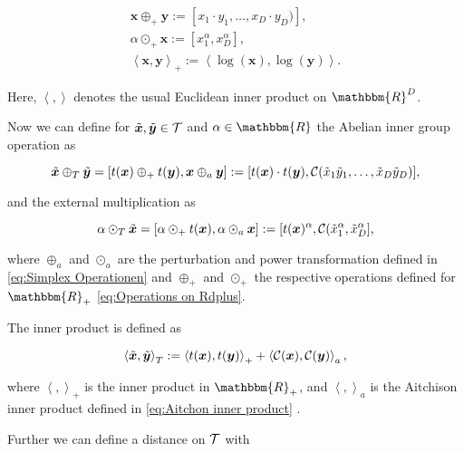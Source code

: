 \begin{gather}
\bm{x} \oplus_+ \bm{y}:= [x_1\cdot y_1,\ldots,x_D \cdot y_D)], \\
\alpha \odot_+ \bm{x} := [x_1^{\alpha},x_D^{\alpha}], \\
\left\langle \bm{x},\bm{y} \right\rangle_+ := \left\langle \log(\bm{x}),\log(\bm{y}) \right\rangle.
\label{eq:Operations on Rdplus}
\end{gather}

Here, $\left\langle ,\right\rangle$ denotes the usual Euclidean inner product on $\mathbbm{R}^D$. 

Now we can define for $\tilde{\bm{x}},\tilde{\bm{y}} \in \mathcal{T}$ and $\alpha \in \mathbbm{R}$ the Abelian inner group operation as 

\begin{equation}
\tilde{\bm{x}} \oplus_T \tilde{\bm{y}} = [t(\bm{x}) \oplus_+ t(\bm{y}), \bm{x} \oplus_a \bm{y}] := [t(\bm{x}) \cdot t(\bm{y}), \mathcal{C}(\tilde{x}_1\tilde{y}_1,\ldots,\tilde{x}_D\tilde{y}_D)],
\label{eq:Abelian inner group operation}
\end{equation}

and the external multiplication as 

\begin{equation}
\alpha \odot_T \tilde{\bm{x}} = [\alpha \odot_+ t(\bm{x}), \alpha \odot_a \bm{x}] := [t(\bm{x})^{\alpha},\mathcal{C}(\tilde{x}_1^{\alpha},\tilde{x}_D^{\alpha}],
\label{eq:external multiplication}
\end{equation}

where $\oplus_a$ and $\odot_a$ are the perturbation and power transformation defined in \ref{eq:Simplex Operationen} and $\oplus_+$ and $\odot_+$ the respective operations defined for $\mathbbm{R}_+$ \ref{eq:Operations on Rdplus}.

The inner product is defined as 

\begin{equation}
\left\langle \tilde{\bm{x}},\tilde{\bm{y}} \right\rangle_T := \left\langle t(\bm{x}),t(\bm{y}) \right\rangle_+ + \left\langle \mathcal{C}(\bm{x}),\mathcal{C}(\bm{y}) \right\rangle_a,
\label{eq:inner product Tspace}
\end{equation}

where $\left\langle ,\right\rangle_+$ is the inner product in $\mathbbm{R}_+$, and $\left\langle ,\right\rangle_a$ is the Aitchison inner product defined in \ref{eq:Aitchon inner product} \cite{Pawlowsky:2013}.

Further we can define a distance on $\mathcal{T}$ with 

